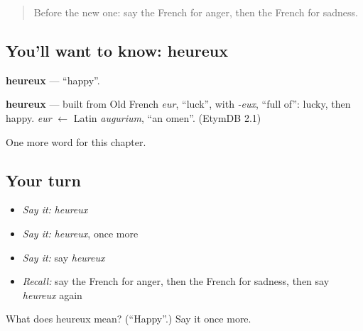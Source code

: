 \label{lesson:FR-C55-heureux}



\begin{quote}
Before the new one: say the French for anger, then the French for sadness.
\end{quote}

\subsection*{You'll want to know: heureux}
\textbf{heureux} — \textquotedblleft{}happy\textquotedblright{}.

\begin{cousinweb}
\textbf{heureux} — built from Old French \emph{eur}, \textquotedblleft{}luck\textquotedblright{}, with \emph{-eux}, \textquotedblleft{}full of\textquotedblright{}: lucky, then happy. \emph{eur} $\leftarrow$ Latin \emph{augurium}, \textquotedblleft{}an omen\textquotedblright{}. (EtymDB 2.1)
\end{cousinweb}

\begin{grammarlens}[title={What you've built}]
One more word for this chapter.
\end{grammarlens}

\subsection*{Your turn}
\begin{itemize}
\raggedright
  \item \emph{Say it:} \emph{heureux}
  \item \emph{Say it:} \emph{heureux}, once more
  \item \emph{Say it:} say \emph{heureux}
  \item \emph{Recall:} say the French for anger, then the French for sadness, then say \emph{heureux} again
\end{itemize}

\begin{tcolorbox}[breakable,colback=teal!4,colframe=teal!35!black,title={Before you move on}]
What does heureux mean? (\textquotedblleft{}Happy\textquotedblright{}.) Say it once more.
\end{tcolorbox}
